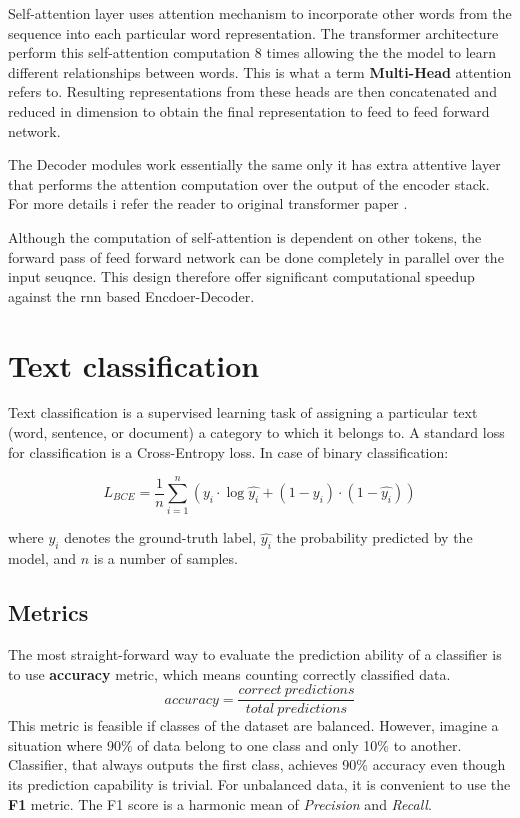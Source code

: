 Self-attention layer uses attention mechanism to incorporate other words from the sequence into each particular word representation. The transformer architecture perform this self-attention computation 8 times allowing the the model to learn different relationships between words. This is what a term \textbf{Multi-Head} attention refers to. Resulting representations from these heads are then concatenated and reduced in dimension to obtain the final representation to feed to feed forward network. 

The Decoder modules work essentially the same only it has extra attentive layer that performs the attention computation over the output of the encoder stack. For more details i refer the reader to original transformer paper \cite{vaswani2017attention}.

Although the computation of self-attention is dependent on other tokens, the forward pass of feed forward network can be done completely in parallel over the input seuqnce. This design therefore offer significant computational speedup against the \gls{rnn} based Encdoer-Decoder.




\section{Text classification}
Text classification is a supervised learning task of assigning a particular text (word, sentence, or document) a category to which it belongs to. A standard loss for classification is a Cross-Entropy loss. In case of binary classification:

\begin{equation}
    L_{BCE} = \frac{1}{n} \sum_{i=1}^n ( y_i \cdot \log\hat{y_i} + (1-y_i)\cdot(1-\hat{y_i}))
\end{equation}

where $y_i$ denotes the ground-truth label, $\hat{y_i}$ the probability predicted by the model, and $n$ is a number of samples.


    
\subsection{Metrics}
The most straight-forward way to evaluate the prediction ability of a classifier is to use \textbf{accuracy} metric, which means counting correctly classified  data. 
\begin{equation}
    accuracy = \frac{correct\ predictions}{total\ predictions}
\end{equation}
This metric is feasible if classes of the dataset are balanced. However, imagine a situation where 90\% of data belong to one class and only 10\% to another. Classifier, that always outputs the first class, achieves 90\% accuracy even though its prediction capability is trivial. For unbalanced data, it is convenient to use the \textbf{F1} metric. The F1 score is a harmonic mean of \textit{Precision} and \textit{Recall}.

